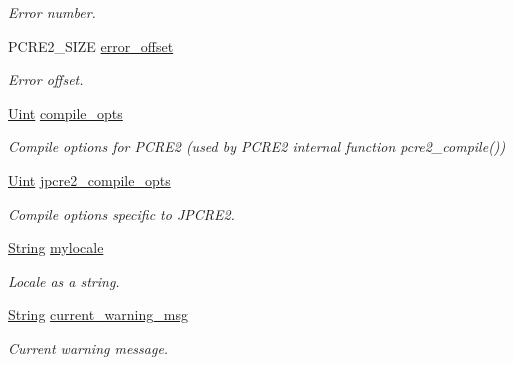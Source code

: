\begin{DoxyCompactItemize}
\begin{DoxyCompactList}\small\item\em Error number. \end{DoxyCompactList}\item 
P\+C\+R\+E2\+\_\+\+S\+I\+ZE \hyperlink{classjpcre2_1_1Regex_a0b9613704582b9c6b0175a21a2a421e0}{error\+\_\+offset}\hypertarget{classjpcre2_1_1Regex_a0b9613704582b9c6b0175a21a2a421e0}{}\label{classjpcre2_1_1Regex_a0b9613704582b9c6b0175a21a2a421e0}

\begin{DoxyCompactList}\small\item\em Error offset. \end{DoxyCompactList}\item 
\hyperlink{namespacejpcre2_a078242d38221a13fb3543b9edd78c099}{Uint} \hyperlink{classjpcre2_1_1Regex_a5954131e9085de63229ed5c11417df69}{compile\+\_\+opts}\hypertarget{classjpcre2_1_1Regex_a5954131e9085de63229ed5c11417df69}{}\label{classjpcre2_1_1Regex_a5954131e9085de63229ed5c11417df69}

\begin{DoxyCompactList}\small\item\em Compile options for P\+C\+R\+E2 (used by P\+C\+R\+E2 internal function pcre2\+\_\+compile()) \end{DoxyCompactList}\item 
\hyperlink{namespacejpcre2_a078242d38221a13fb3543b9edd78c099}{Uint} \hyperlink{classjpcre2_1_1Regex_abdd26c3bc1c3132f0aa73dde1690a7ef}{jpcre2\+\_\+compile\+\_\+opts}\hypertarget{classjpcre2_1_1Regex_abdd26c3bc1c3132f0aa73dde1690a7ef}{}\label{classjpcre2_1_1Regex_abdd26c3bc1c3132f0aa73dde1690a7ef}

\begin{DoxyCompactList}\small\item\em Compile options specific to J\+P\+C\+R\+E2. \end{DoxyCompactList}\item 
\hyperlink{namespacejpcre2_a91f03070152fb228bc116c5a737f1d16}{String} \hyperlink{classjpcre2_1_1Regex_a92a3ad992cade62d103248302f7e2f2d}{mylocale}\hypertarget{classjpcre2_1_1Regex_a92a3ad992cade62d103248302f7e2f2d}{}\label{classjpcre2_1_1Regex_a92a3ad992cade62d103248302f7e2f2d}

\begin{DoxyCompactList}\small\item\em Locale as a string. \end{DoxyCompactList}\item 
\hyperlink{namespacejpcre2_a91f03070152fb228bc116c5a737f1d16}{String} \hyperlink{classjpcre2_1_1Regex_a1cfacd49c8bceaae1e2a66efd4082ea8}{current\+\_\+warning\+\_\+msg}\hypertarget{classjpcre2_1_1Regex_a1cfacd49c8bceaae1e2a66efd4082ea8}{}\label{classjpcre2_1_1Regex_a1cfacd49c8bceaae1e2a66efd4082ea8}

\begin{DoxyCompactList}\small\item\em Current warning message. \end{DoxyCompactList}\end{DoxyCompactItemize}
